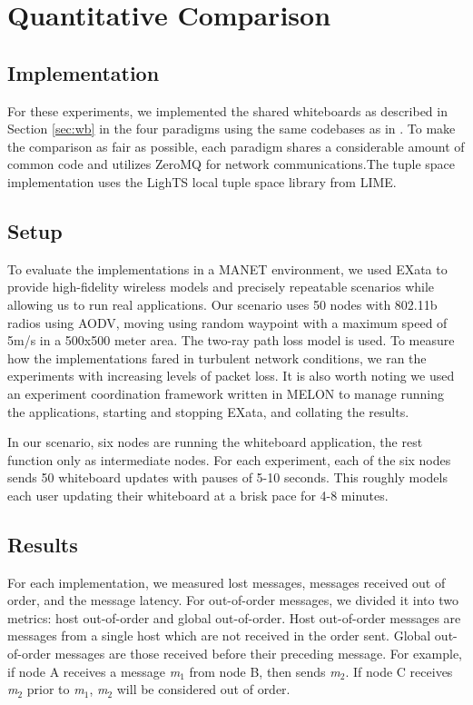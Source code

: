 \documentclass{llncs}
\begin{document}
\section{Quantitative Comparison}\label{sec:comparison}

\subsection{Implementation}

For these experiments, we implemented the shared whiteboards as described in Section \ref{sec:wb} in the four paradigms using the same codebases as in \cite{melon}. To make the comparison as fair as possible, each paradigm shares a considerable amount of common code and utilizes ZeroMQ for network communications.The tuple space implementation uses the LighTS\cite{lights} local tuple space library from LIME.

\subsection{Setup}

To evaluate the implementations in a MANET environment, we used EXata\cite{exata} to provide high-fidelity wireless models and precisely repeatable scenarios while allowing us to run real applications. Our scenario uses 50 nodes with 802.11b radios using AODV\cite{aodv}, moving using random waypoint with a maximum speed of 5m/s in a 500x500 meter area. The two-ray path loss model is used. To measure how the implementations fared in turbulent network conditions, we ran the experiments with increasing levels of packet loss. It is also worth noting we used an experiment coordination framework written in MELON to manage running the applications, starting and stopping EXata, and collating the results.

In our scenario, six nodes are running the whiteboard application, the rest function only as intermediate nodes. For each experiment, each of the six nodes sends 50 whiteboard updates with pauses of 5-10 seconds. This roughly models each user updating their whiteboard at a brisk pace for 4-8 minutes.

\subsection{Results}

For each implementation, we measured lost messages, messages received out of order, and the message latency. For out-of-order messages, we divided it into two metrics: host out-of-order and global out-of-order. Host out-of-order messages are messages from a single host which are not received in the order sent. Global out-of-order messages are those received before their preceding message. For example, if node A receives a message \textit{m}$_{1}$ from node B, then sends \textit{m}$_{2}$. If node C receives \textit{m}$_{2}$ prior to \textit{m}$_{1}$, \textit{m}$_{2}$ will be considered out of order.
\end{document}
